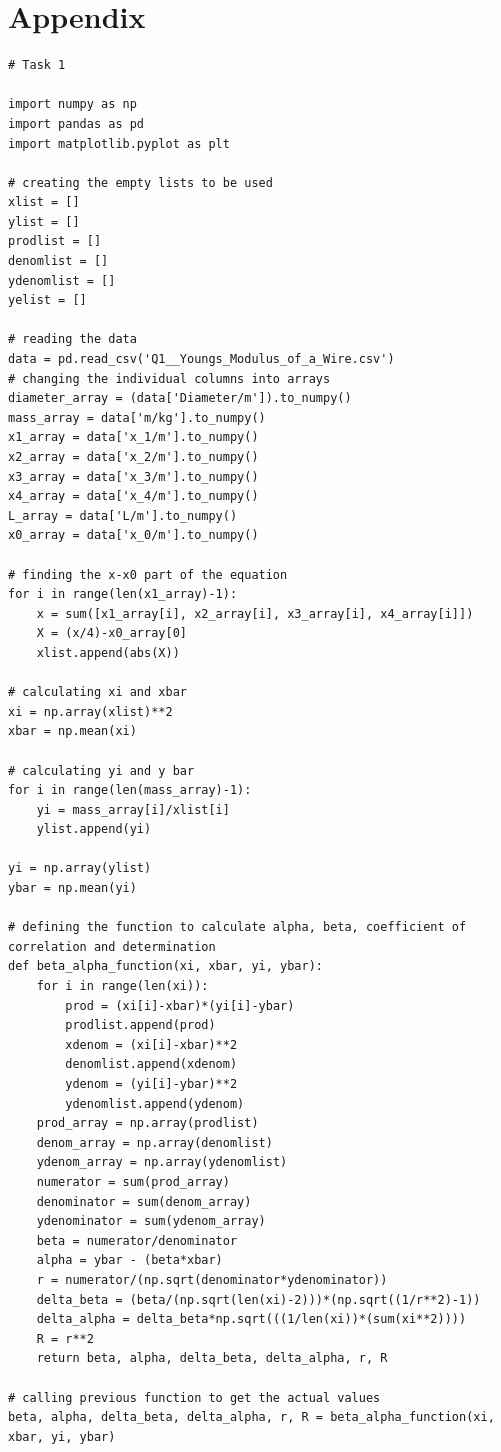 \documentclass[12pt, a4paper]{article}
\begin{document}
\section*{Appendix}
\begin{verbatim}
# Task 1

import numpy as np
import pandas as pd
import matplotlib.pyplot as plt

# creating the empty lists to be used
xlist = []
ylist = []
prodlist = []
denomlist = []
ydenomlist = []
yelist = []

# reading the data
data = pd.read_csv('Q1__Youngs_Modulus_of_a_Wire.csv')
# changing the individual columns into arrays
diameter_array = (data['Diameter/m']).to_numpy()
mass_array = data['m/kg'].to_numpy()
x1_array = data['x_1/m'].to_numpy()
x2_array = data['x_2/m'].to_numpy()
x3_array = data['x_3/m'].to_numpy()
x4_array = data['x_4/m'].to_numpy()
L_array = data['L/m'].to_numpy()
x0_array = data['x_0/m'].to_numpy()

# finding the x-x0 part of the equation
for i in range(len(x1_array)-1):
    x = sum([x1_array[i], x2_array[i], x3_array[i], x4_array[i]])
    X = (x/4)-x0_array[0]
    xlist.append(abs(X))

# calculating xi and xbar
xi = np.array(xlist)**2
xbar = np.mean(xi)

# calculating yi and y bar
for i in range(len(mass_array)-1):
    yi = mass_array[i]/xlist[i]
    ylist.append(yi)

yi = np.array(ylist)
ybar = np.mean(yi)

# defining the function to calculate alpha, beta, coefficient of correlation and determination
def beta_alpha_function(xi, xbar, yi, ybar):
    for i in range(len(xi)):
        prod = (xi[i]-xbar)*(yi[i]-ybar)
        prodlist.append(prod)
        xdenom = (xi[i]-xbar)**2
        denomlist.append(xdenom)
        ydenom = (yi[i]-ybar)**2
        ydenomlist.append(ydenom)
    prod_array = np.array(prodlist)
    denom_array = np.array(denomlist)
    ydenom_array = np.array(ydenomlist)
    numerator = sum(prod_array)
    denominator = sum(denom_array)
    ydenominator = sum(ydenom_array)
    beta = numerator/denominator
    alpha = ybar - (beta*xbar)
    r = numerator/(np.sqrt(denominator*ydenominator))
    delta_beta = (beta/(np.sqrt(len(xi)-2)))*(np.sqrt((1/r**2)-1))
    delta_alpha = delta_beta*np.sqrt(((1/len(xi))*(sum(xi**2))))
    R = r**2
    return beta, alpha, delta_beta, delta_alpha, r, R

# calling previous function to get the actual values
beta, alpha, delta_beta, delta_alpha, r, R = beta_alpha_function(xi, xbar, yi, ybar)


\end{verbatim}
\end{document}
